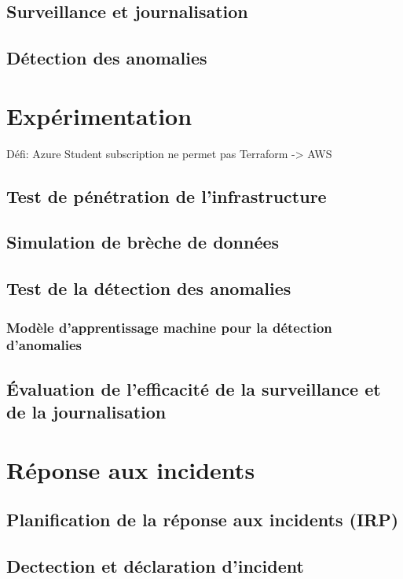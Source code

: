 \documentclass[conference]{IEEEtran}
\begin{document}
\subsection{Surveillance et journalisation}

\subsection{Détection des anomalies}

\section{Expérimentation}

Défi: Azure Student subscription ne permet pas Terraform -> AWS

\subsection{Test de pénétration de l'infrastructure}

\subsection{Simulation de brèche de données}

\subsection{Test de la détection des anomalies}
\subsubsection{Modèle d'apprentissage machine pour la détection d'anomalies}
\subsection{Évaluation de l'efficacité de la surveillance et de la journalisation}

\section{Réponse aux incidents}

\subsection{Planification de la réponse aux incidents (IRP)}

\subsection{Dectection et déclaration d'incident}
\end{document}
